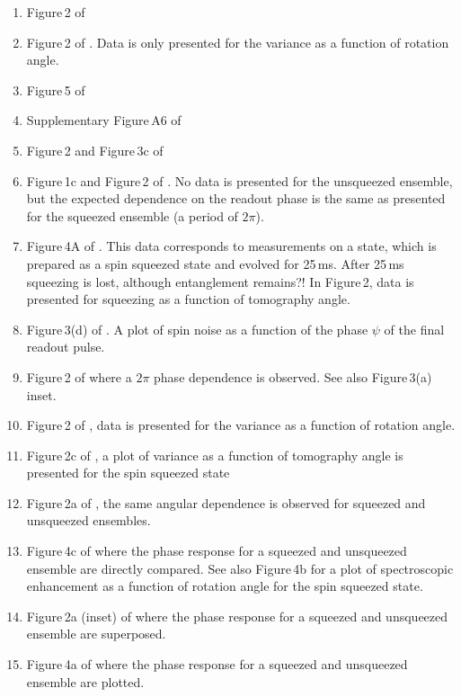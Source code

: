 \documentclass[reqno]{amsart}
\begin{document}
\begin{enumerate}
\item Figure\,2 of \cite{Gross2010}
\item Figure\,2 of \cite{Leroux2010}. Data is only presented for the variance as a function of rotation angle.
\item Figure\,5 of \cite{LouchetChauvet2010}
\item Supplementary Figure\,A6 of \cite{SchleierSmith2010}
\item Figure\,2 and Figure\,3c of \cite{Bohnet2014}
\item Figure\,1c and Figure\,2 of \cite{Muessel2014}. No data is presented for the unsqueezed ensemble, but the expected dependence on the readout phase is the same as presented for the squeezed ensemble (a period of $2\pi$).
\item Figure\,4A of \cite{Strobel2014}. This data corresponds to measurements on a state, which is prepared as a spin squeezed state and evolved for 25\,ms. After 25\,ms squeezing is lost, although entanglement remains?! In Figure\,2, data is presented for squeezing as a function of tomography angle. 
\item Figure\,3(d) of \cite{Cox2016}. A plot of spin noise as a function of the phase $\psi$ of the final readout pulse.
\item Figure\,2 of \cite{Linnemann2016} where a $2\pi$ phase dependence is observed. See also Figure\,3(a) inset.
\item Figure\,2 of \cite{Braverman2019}, data is presented for the variance as a function of rotation angle.
\item Figure\,2c of \cite{PedrozoPenafiel2020}, a plot of variance as a function of tomography angle is presented for the spin squeezed state
\item Figure\,2a of \cite{Riedel2010}, the same angular dependence is observed for squeezed and unsqueezed ensembles.
\item Figure\,4c of \cite{Colombo2022} where the phase response for a squeezed and unsqueezed ensemble are directly compared. See also Figure\,4b for a plot of spectroscopic enhancement as a function of rotation angle for the spin squeezed state.
\item Figure\,2a (inset) of \cite{Eckner2023} where the phase response for a squeezed and unsqueezed ensemble are superposed.
\item Figure\,4a of \cite{Franke2023} where the phase response for a squeezed and unsqueezed ensemble are plotted.
\end{enumerate}
\end{document}
